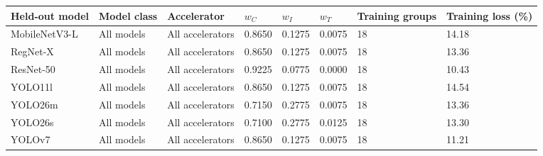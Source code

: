 \begin{tabular}{@{}llllllll@{}}
\toprule
Held-out model & Model class & Accelerator & $w_C$ & $w_I$ & $w_T$ & Training groups & Training loss (\%) \\
\midrule
MobileNetV3-L & All models & All accelerators & 0.8650 & 0.1275 & 0.0075 & 18 & 14.18 \\
RegNet-X & All models & All accelerators & 0.8650 & 0.1275 & 0.0075 & 18 & 13.36 \\
ResNet-50 & All models & All accelerators & 0.9225 & 0.0775 & 0.0000 & 18 & 10.43 \\
YOLO11l & All models & All accelerators & 0.8650 & 0.1275 & 0.0075 & 18 & 14.54 \\
YOLO26m & All models & All accelerators & 0.7150 & 0.2775 & 0.0075 & 18 & 13.36 \\
YOLO26s & All models & All accelerators & 0.7100 & 0.2775 & 0.0125 & 18 & 13.30 \\
YOLOv7 & All models & All accelerators & 0.8650 & 0.1275 & 0.0075 & 18 & 11.21 \\
\bottomrule
\end{tabular}
